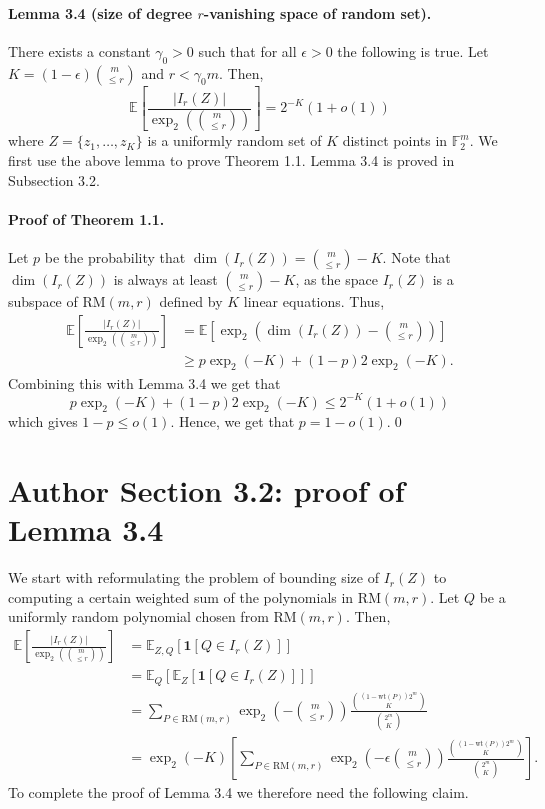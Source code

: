 \documentclass[10pt,a4paper]{article}
\begin{document}
\paragraph{Lemma 3.4 (size of degree $r$-vanishing space of random set).} There exists a constant $\gamma_0>0$ such that for all $\epsilon>0$ the following is true. Let $K=(1-\epsilon)\binom m{\le r}$ and $r<\gamma_0m$. Then,
\[\mathbb E\left[\frac{|I_r(Z)|}{\operatorname{exp}_2\left(\binom m{\le r}\right)}\right]=2^{-K}(1+o(1))\]
where $Z=\{z_1,\ldots,z_K\}$ is a uniformly random set of $K$ distinct points in $\mathbb F_2^m$. We first use the above lemma to prove Theorem 1.1. Lemma 3.4 is proved in Subsection 3.2.
\paragraph{Proof of Theorem 1.1.} Let $p$ be the probability that $\dim(I_r(Z))=\binom m{\le r}-K$. Note that $\dim(I_r(Z))$ is always at least $\binom m{\le r}-K$, as the space $I_r(Z)$ is a subspace of $\mathrm{RM}(m,r)$ defined by $K$ linear equations. Thus,
\begin{align*}\mathbb E\left[\frac{|I_r(Z)|}{\operatorname{exp}_2\left(\binom m{\le r}\right)}\right]&=\mathbb E\left[\operatorname{exp}_2\left(\dim(I_r(Z))-\binom m{\le r}\right)\right]\\&\ge p\operatorname{exp}_2(-K)+(1-p)2\operatorname{exp}_2(-K).\end{align*}
Combining this with Lemma 3.4 we get that
\[p\operatorname{exp}_2(-K)+(1-p)2\operatorname{exp}_2(-K)\le2^{-K}(1+o(1))\]
which gives $1-p\le o(1)$. Hence, we get that $p=1-o(1)$.\qed
\section*{Author Section 3.2: proof of Lemma 3.4}
We start with reformulating the problem of bounding size of $I_r(Z)$ to computing a certain weighted sum of the polynomials in $\mathrm{RM}(m,r)$. Let $Q$ be a uniformly random polynomial chosen from $\mathrm{RM}(m,r)$. Then,
\begin{align*}
\mathbb E\left[\frac{|I_r(Z)|}{\operatorname{exp}_2\left(\binom m{\le r}\right)}\right]&=\mathbb E_{Z,Q}[\mathbf1[Q\in I_r(Z)]]\\&=\mathbb E_Q[\mathbb E_Z[\mathbf1[Q\in I_r(Z)]]]\\
&=\sum_{P\in\mathrm{RM}(m,r)}\operatorname{exp}_2\left(-\binom m{\le r}\right)\frac{\binom{(1-\mathrm{wt}(P))2^m}K}{\binom{2^m}K}\\
&=\operatorname{exp}_2(-K)\left[\sum_{P\in\mathrm{RM}(m,r)}\operatorname{exp}_2\left(-\epsilon\binom m{\le r}\right)\frac{\binom{(1-\mathrm{wt}(P))2^m}K}{\binom{2^m}K}\right].
\end{align*}
To complete the proof of Lemma 3.4 we therefore need the following claim.
\end{document}
